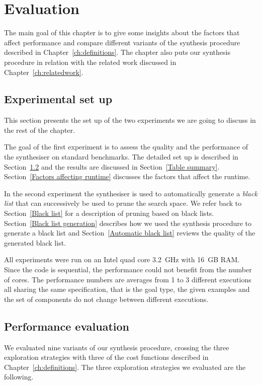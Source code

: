 \lstset{style=plain}

\chapter{Evaluation} \label{ch:evaluation}

The main goal of this chapter is to give some insights about the factors that affect performance and compare different variants of the synthesis procedure described in Chapter~\ref{ch:definitions}. The chapter also puts our synthesis procedure in relation with the related work discussed in Chapter~\ref{ch:relatedwork}.


\section{Experimental set up}
This section presents the set up of the two experiments we are going to discuss in the rest of the chapter.

The goal of the first experiment is to assess the quality and the performance of the synthesiser on standard benchmarks. The detailed set up is described in Section~\ref{Evaluation on benchmarks} and the results are discussed in Section~\ref{Table summary}. Section~\ref{Factors affecting runtime} discusses the factors that affect the runtime.

In the second experiment the synthesiser is used to automatically generate a \emph{black list} that can successively be used to prune the search space. We refer back to Section~\ref{Black list} for a description of pruning based on black lists. Section~\ref{Black list generation} describes how we used the synthesis procedure to generate a black list and Section~\ref{Automatic black list} reviews the quality of the generated black list.

All experiments were run on an Intel quad core 3.2~GHz with 16~GB RAM. Since the code is sequential, the performance could not benefit from the number of cores. The performance numbers are averages from 1 to 3 different executions all sharing the same specification, that is the goal type, the given examples and the set of components do not change between different executions.

\section{Performance evaluation}\label{Evaluation on benchmarks}

We evaluated nine variants of our synthesis procedure, crossing the three exploration strategies with three of the cost functions described in Chapter~\ref{ch:definitions}. The three exploration strategies we evaluated are the following.

